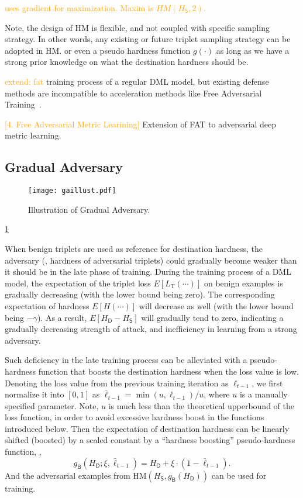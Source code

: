 \documentclass[10pt,twocolumn,letterpaper]{article}
\newcommand{\oo}[1]{\textcolor{orange}{#1}}
\begin{document}
\oo{uses gradient for maximization. Maxim is $HM(H_\mathsf{S}, 2)$.}

Note, the design of HM is flexible, and not coupled with specific sampling
strategy.
%
In other words, any existing or future triplet sampling strategy can
be adopted in HM.
%
or even a pseudo hardness function $g(\cdot)$ as long as we have a strong
prior knowledge on what the destination hardness should be.

\oo{extend: fat}
training process of a regular DML model, but existing defense methods are
incompatible to acceleration methods like Free Adversarial
Training~\cite{freeat}.

\oo{[4. Free Adversarial Metric Learining]}
Extension of FAT to adversarial deep metric learning.

\subsection{Gradual Adversary}
\label{sec:32}

\begin{figure}
	\texttt{[image: gaillust.pdf]}
	\caption{Illustration of Gradual Adversary.}
	\label{fig:ga}
\end{figure}

\cref{fig:ga}


When benign triplets are used as reference for destination hardness, the
adversary (\ie, hardness of adversarial triplets) could gradually become weaker
than it should be in the late phase of training.
%
During the training process of a DML model, the expectation of the triplet loss
$E[L_\text{T}(\cdots)]$ on benign examples is gradually decreasing
(with the lower bound being zero).
%
The corresponding expectation of hardness $E[H(\cdots)]$ will
decrease as well (with the lower bound being $-\gamma$).
%
As a result, $E[H_\mathsf{D}-H_\mathsf{S}]$ will gradually tend to zero,
indicating a gradually decreasing strength of attack, and inefficiency in
learning from a strong adversary.


Such deficiency in the late training process can be alleviated with a
pseudo-hardness function that boosts the destination hardness when the loss
value is low.
%
Denoting the loss value from the previous training iteration as $\ell_{t-1}$,
we first normalize it into $[0,1]$ as $\bar{\ell}_{t-1}=\min(u,\ell_{t-1})/u$,
where $u$ is a manually specified parameter.
%
Note, $u$ is much less than the theoretical upperbound of the loss function,
in order to avoid excessive hardness boost in the functions introduced below.
%
Then the expectation of destination hardness can be linearly shifted (boosted)
by a scaled constant by a ``hardness boosting'' pseudo-hardness
function, \ie,
%
\begin{equation}
	g_\mathsf{B}(H_\mathsf{D};\xi,\bar{\ell}_{t-1}) =
	H_\mathsf{D} + \xi \cdot (1-\bar{\ell}_{t-1}).
\end{equation}
%
And the adversarial examples from $\text{HM}(H_\mathsf{S},g_\mathsf{B}(H_\mathsf{D}))$
can be used for training.
\end{document}
